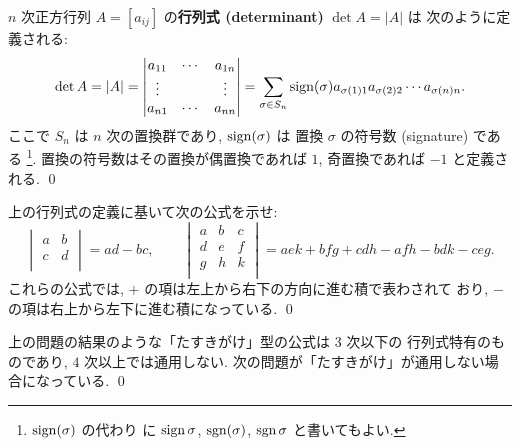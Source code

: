 \documentclass[12pt,twoside]{jarticle}
\begin{document}
\begin{definition}[行列式]
  \label{def:det}
  $n$ 次正方行列 $A=[a_{ij}]$ の{\bf 行列式 (determinant)} $\det A=|A|$ は
  次のように定義される:
  \begin{equation*}
    \det A = |A| = 
    \begin{vmatrix}
      a_{11} & \cdots & a_{1n} \\
      \vdots &        & \vdots \\
      a_{n1} & \cdots & a_{nn} \\
    \end{vmatrix}
    =
    \sum_{\sigma\in S_n} \mathop{\mathrm{sign}}\nolimits(\sigma)
    a_{\sigma(1)1}a_{\sigma(2)2}\cdots a_{\sigma(n)n}.
  \end{equation*}
  ここで $S_n$ は $n$ 次の置換群であり,  $\mathop{\mathrm{sign}}\nolimits(\sigma)$ は
  置換 $\sigma$ の符号数 (signature) である%
  \footnote{$\mathop{\mathrm{sign}}\nolimits(\sigma)$ の代わり
    に $\mathop{\mathrm{sign}}\nolimits\sigma$, $\mathop{\mathrm{sgn}}\nolimits(\sigma)$, $\mathop{\mathrm{sgn}}\nolimits\sigma$ と書いてもよい.}.   
  置換の符号数はその置換が偶置換であれば $1$, 奇置換であれば $-1$ と定義される.
  \qed
\end{definition}


\begin{question}
  上の行列式の定義に基いて次の公式を示せ:
  \begin{equation*}
    \begin{vmatrix}
      a & b \\
      c & d \\
    \end{vmatrix}
    = ad - bc, 
    \qquad
    \begin{vmatrix}
      a & b & c \\
      d & e & f \\
      g & h & k \\
    \end{vmatrix}
    = aek + bfg + cdh - afh - bdk - ceg.
  \end{equation*}
  これらの公式では, $+$ の項は左上から右下の方向に進む積で表わされて
  おり, $-$ の項は右上から左下に進む積になっている.
  \qed
\end{question}

\begin{rem}
  上の問題の結果のような「たすきがけ」型の公式は $3$ 次以下の
  行列式特有のものであり, $4$ 次以上では通用しない. 
  次の問題が「たすきがけ」が通用しない場合になっている.
  \qed
\end{rem}
\end{document}
